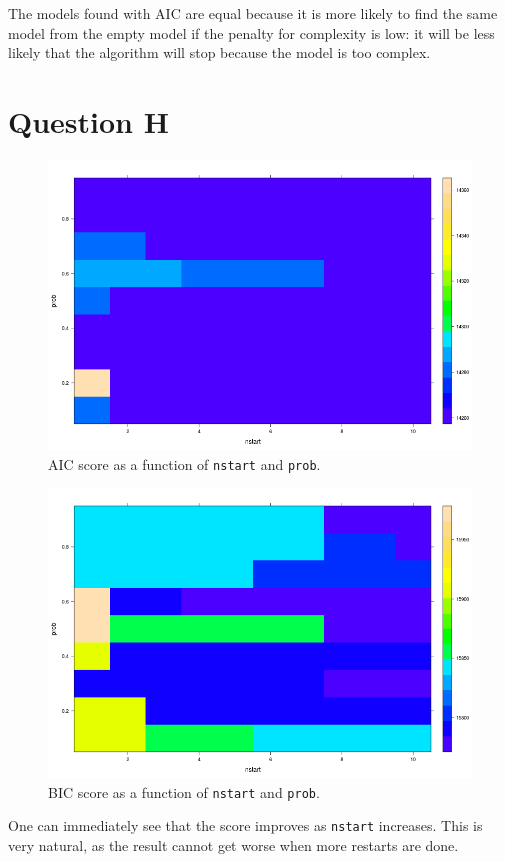 \documentclass[12pt]{article}
\theoremstyle{definition}
\begin{document}
The models found with AIC are equal because it is more likely to find the
same model from the empty model if the penalty for complexity is low: it will
be less likely that the algorithm will stop because the model is too complex.

\section*{Question H}

\begin{figure}[H]
    \centering
    \includegraphics[width=0.8\linewidth]{aic_plot.png}
    \caption{AIC score as a function of \texttt{nstart} and \texttt{prob}.}
\label{fig:aic_plot}
\end{figure}

\begin{figure}[H]
    \centering
    \includegraphics[width=0.8\linewidth]{bic_plot.png}
    \caption{BIC score as a function of \texttt{nstart} and \texttt{prob}.}
\label{fig:bic_plot}
\end{figure}

One can immediately see that the score improves as \texttt{nstart} increases.
This is very natural, as the result cannot get worse when more restarts are done.
\end{document}
